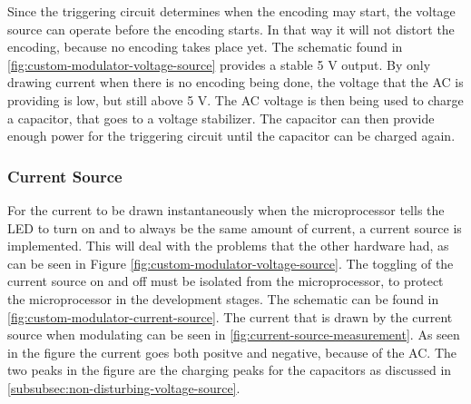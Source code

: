	Since the triggering circuit determines when the encoding may start, the voltage source can operate before the encoding starts.
	In that way it will not distort the encoding, because no encoding takes place yet.
	The schematic found in \autoref{fig:custom-modulator-voltage-source} provides a stable 5 V output.
	By only drawing current when there is no encoding being done, the voltage that the AC is providing is low, but still above 5 V.
	The AC voltage is then being used to charge a capacitor, that goes to a voltage stabilizer.
	The capacitor can then provide enough power for the triggering circuit until the capacitor can be charged again.





	\subsubsection{Current Source}


	For the current to be drawn instantaneously when the microprocessor tells the LED to turn on and to always be the same amount of current, a current source is implemented. 
	This will deal with the problems that the other hardware had, as can be seen in Figure \ref{fig:custom-modulator-voltage-source}.
	The toggling of the current source on and off must be isolated from the microprocessor, to protect the microprocessor in the development stages.
	The schematic can be found in \autoref{fig:custom-modulator-current-source}.
	The current that is drawn by the current source when modulating can be seen in \autoref{fig:current-source-measurement}.
	As seen in the figure the current goes both positve and negative, because of the AC.
	The two peaks in the figure are the charging peaks for the capacitors as discussed in \autoref{subsubsec:non-disturbing-voltage-source}.



